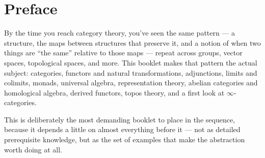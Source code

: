 \chapter*{Preface}

By the time you reach category theory, you've seen the same
pattern --- a structure, the maps between structures that preserve it,
and a notion of when two things are ``the same'' relative to those maps
--- repeat across groups, vector spaces, topological spaces, and more.
This booklet makes that pattern the actual subject: categories,
functors and natural transformations, adjunctions, limits and colimits,
monads, universal algebra, representation theory, abelian categories
and homological algebra, derived functors, topos theory, and a first
look at $\infty$-categories.

This is deliberately the most demanding booklet to place in the
sequence, because it depends a little on almost everything before it
--- not as detailed prerequisite knowledge, but as the set of examples
that make the abstraction worth doing at all.
